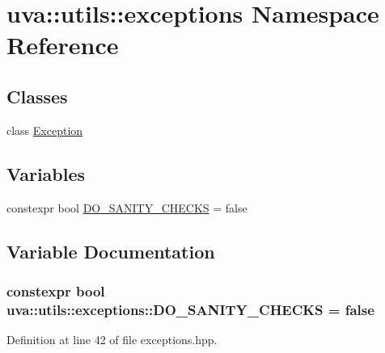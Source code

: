 \hypertarget{namespaceuva_1_1utils_1_1exceptions}{}\section{uva\+:\+:utils\+:\+:exceptions Namespace Reference}
\label{namespaceuva_1_1utils_1_1exceptions}
\subsection*{Classes}
\begin{DoxyCompactItemize}
\item 
class \hyperlink{classuva_1_1utils_1_1exceptions_1_1_exception}{Exception}
\end{DoxyCompactItemize}
\subsection*{Variables}
\begin{DoxyCompactItemize}
\item 
constexpr bool \hyperlink{namespaceuva_1_1utils_1_1exceptions_ae769de24af658b2759564fbbfea5c5f0}{D\+O\+\_\+\+S\+A\+N\+I\+T\+Y\+\_\+\+C\+H\+E\+C\+K\+S} = false
\end{DoxyCompactItemize}


\subsection{Variable Documentation}
\hypertarget{namespaceuva_1_1utils_1_1exceptions_ae769de24af658b2759564fbbfea5c5f0}{}
\subsubsection[{D\+O\+\_\+\+S\+A\+N\+I\+T\+Y\+\_\+\+C\+H\+E\+C\+K\+S}]{\setlength{\rightskip}{0pt plus 5cm}constexpr bool uva\+::utils\+::exceptions\+::\+D\+O\+\_\+\+S\+A\+N\+I\+T\+Y\+\_\+\+C\+H\+E\+C\+K\+S = false}\label{namespaceuva_1_1utils_1_1exceptions_ae769de24af658b2759564fbbfea5c5f0}


Definition at line 42 of file exceptions.\+hpp.

